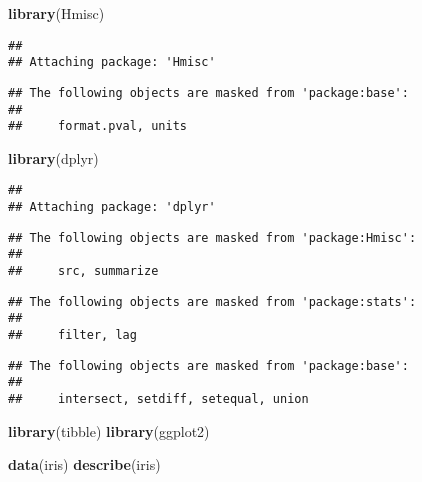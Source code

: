 \documentclass[
]{article}
\newenvironment{Shaded}{\begin{snugshade}}{\end{snugshade}}
\newcommand{\FunctionTok}[1]{\textcolor[rgb]{0.13,0.29,0.53}{\textbf{#1}}}
\newcommand{\NormalTok}[1]{#1}
\begin{document}
\begin{Shaded}
\begin{Highlighting}[]
\FunctionTok{library}\NormalTok{(Hmisc)}
\end{Highlighting}
\end{Shaded}

\begin{verbatim}
## 
## Attaching package: 'Hmisc'
\end{verbatim}

\begin{verbatim}
## The following objects are masked from 'package:base':
## 
##     format.pval, units
\end{verbatim}

\begin{Shaded}
\begin{Highlighting}[]
\FunctionTok{library}\NormalTok{(dplyr)}
\end{Highlighting}
\end{Shaded}

\begin{verbatim}
## 
## Attaching package: 'dplyr'
\end{verbatim}

\begin{verbatim}
## The following objects are masked from 'package:Hmisc':
## 
##     src, summarize
\end{verbatim}

\begin{verbatim}
## The following objects are masked from 'package:stats':
## 
##     filter, lag
\end{verbatim}

\begin{verbatim}
## The following objects are masked from 'package:base':
## 
##     intersect, setdiff, setequal, union
\end{verbatim}

\begin{Shaded}
\begin{Highlighting}[]
\FunctionTok{library}\NormalTok{(tibble)}
\FunctionTok{library}\NormalTok{(ggplot2)}

\FunctionTok{data}\NormalTok{(iris)}
\FunctionTok{describe}\NormalTok{(iris)}
\end{Highlighting}
\end{Shaded}
\end{document}
